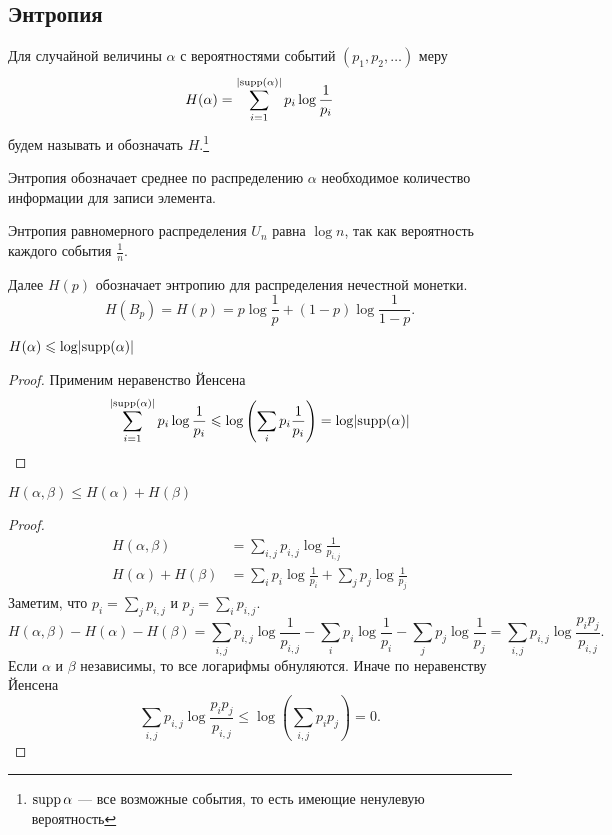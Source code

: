 \subsection{Энтропия}
\begin{defn}[Энтропия]
	Для случайной величины $  \alpha $ с вероятностями событий $ (p_1, p_2, \ldots )$ меру
\[
	H( \alpha ) = \sum_{i = 1}^{\lvert \operatorname{supp} ( \alpha ) \rvert } p_i \log \frac{1}{p_i}
\] 
	будем называть  и обозначать $ H$.\footnote{$ \operatorname{supp} \alpha $ --- все возможные события, то есть имеющие ненулевую вероятность}

Энтропия обозначает среднее по распределению $  \alpha $ необходимое количество информации для записи элемента.
\end{defn}
\begin{note}
    Энтропия равномерного распределения $U_n$ равна $ \log n$, так как вероятность каждого события $ \frac{1}{n}$.
\end{note}
\begin{note}
	Далее $ H(p) $ обозначает энтропию для распределения нечестной монетки.
	\[
		H(B_p) = H(p) = p \log \frac{1}{p} + (1-p) \log \frac{1}{1-p}
	.\] 
\end{note}

\begin{thm}
	$ H( \alpha ) \leqslant  \log \lvert \operatorname{supp} ( \alpha ) \rvert $
\end{thm}
\begin{proof}
	Применим неравенство Йенсена
	 \[
	\begin{aligned}
		\sum_{i = 1}^{\lvert \operatorname{supp} ( \alpha ) \rvert } p_i \log \frac{1}{p_i} \leqslant  \log \left( \sum_{i}^{} p_i \frac{1}{p_i} \right)  = \log \lvert \operatorname{supp} ( \alpha ) \rvert 
	\end{aligned}
	\]
\end{proof}
\begin{thm}
	$ H( \alpha , \beta ) \le H( \alpha ) + H ( \beta )$
\end{thm}
\begin{proof}
    \[
    \begin{aligned}
		H( \alpha , \beta ) &= \sum_{i, j}^{} p_{i, j} \log \frac{1}{p_{i, j}} \\
		H( \alpha ) + H( \beta ) &= \sum_{i}^{} p_i\log  \frac{1}{p_i} + \sum_{j}^{} p_j \log \frac{1}{p_j}
	\end{aligned}
	\]
	Заметим, что $ p_i = \sum\limits_{j}^{} p_{i, j}$ и $ p_j = \sum\limits_{i}^{} p_{i, j}$.
	\[
		H( \alpha , \beta ) -H( \alpha ) - H( \beta )= \sum_{i, j}^{} p_{i, j} \log \frac{1}{p_{i, j}}
		- \sum_{i}^{} p_i\log  \frac{1}{p_i} - \sum_{j}^{} p_j \log \frac{1}{p_j} = \sum_{i, j}^{ } p_{i, j} \log \frac{p_i p_j}{p_{i, j}}
	.\] 
	Если $  \alpha $ и $ \beta $ независимы, то все логарифмы обнуляются. Иначе по неравенству Йенсена
	\[
		\sum_{i, j}^{ } p_{i, j} \log \frac{p_i p_j}{p_{i, j}} \le  \log \left( \sum_{i, j}^{ } p_i p_j \right)  = 0
	.\] 
\end{proof}

